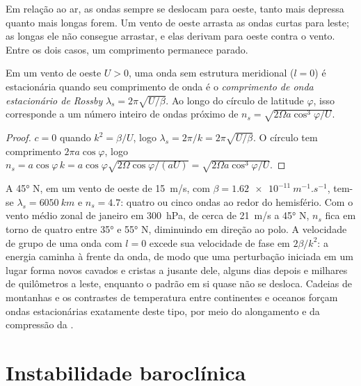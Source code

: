 Em relação ao ar, as ondas sempre se deslocam para oeste, tanto mais depressa quanto mais longas
forem. Um vento de oeste arrasta as ondas curtas para leste; as longas ele
não consegue arrastar, e elas derivam para oeste contra o vento. Entre
os dois casos, um comprimento permanece parado.

\begin{proposition}\label{prop:b3:atmospheric-dynamics:stationary}
Em um vento de oeste $U > 0$, uma onda sem estrutura meridional ($l = 0$) é
estacionária quando seu comprimento de onda é o \emph{comprimento de onda
estacionário de Rossby} $\lambda_s =
2\pi\sqrt{U/\beta}$. Ao longo do círculo de latitude $\varphi$, isso corresponde a um
número inteiro de ondas próximo de $n_s = \sqrt{2\Omega a\cos^3\varphi/U}$.
\end{proposition}

\begin{proof}
$c = 0$ quando $k^2 = \beta/U$, logo $\lambda_s = 2\pi/k = 2\pi\sqrt{U/\beta}$.
O círculo tem comprimento $2\pi a\cos\varphi$, logo $n_s = a\cos\varphi\,k =
a\cos\varphi\sqrt{2\Omega\cos\varphi/(aU)} = \sqrt{2\Omega a\cos^3\varphi/U}$.
\end{proof}

A \ang{45} N, em um vento de oeste de \qty{15}{m/s}, com $\beta =
\qty{1.62e-11}{m^{-1}.s^{-1}}$, tem-se $\lambda_s = \qty{6050}{km}$ e $n_s =
4.7$: quatro ou cinco ondas ao redor do hemisfério. Com o vento médio zonal
de janeiro em \qty{300}{hPa}, de cerca de \qty{21}{m/s} a \ang{45} N, $n_s$ fica
em torno de quatro entre \ang{35} e \ang{55} N, diminuindo em direção ao polo. A velocidade de grupo
de uma onda com $l = 0$ excede sua velocidade de fase em $2\beta/k^2$: a energia caminha
à frente da onda, de modo que uma perturbação iniciada em um lugar forma novos cavados
e cristas a jusante dele, alguns dias depois e milhares de quilômetros
a leste, enquanto o padrão em si quase não se desloca. Cadeias de montanhas e os contrastes
de temperatura entre continentes e oceanos forçam ondas estacionárias exatamente
deste tipo, por meio do alongamento e da compressão da
.


\section{Instabilidade baroclínica}\label{sec:b3:atmospheric-dynamics:baroclinic}

